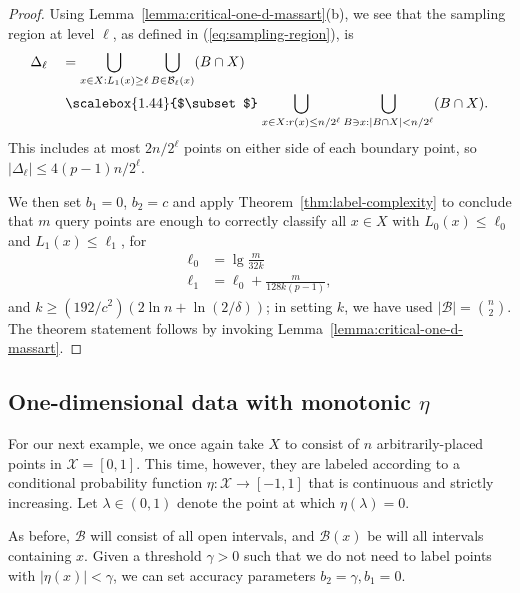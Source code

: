 \documentclass[anon,12pt]{colt2022} %
\def\X{{\mathcal X}}
\def\B{{\mathcal B}}
\newcommand\bigsubset[1][1.19]{%
   \mathrel{\vcenter{\hbox{\scalebox{#1}{$\subset$}}}}}
\begin{document}
\begin{proof}
Using Lemma~\ref{lemma:critical-one-d-massart}(b), we see that the sampling region at level $\ell$, as defined in (\ref{eq:sampling-region}), is
\begin{align*}
\Delta_\ell \ \ \ 
&= \bigcup_{x \in X: L_1(x) \geq \ell} \bigcup_{B \in \B_{\ell}(x)} (B \cap X) \\
&\bigsubset[1.44] \bigcup_{x \in X: r(x) \leq n/2^\ell} \bigcup_{B \ni x: |B \cap X| < n/2^\ell} (B \cap X) 
.
\end{align*}
This includes at most $2n/2^{\ell}$ points on either side of each boundary point, so $|\Delta_\ell| \leq 4(p-1)n/2^{\ell}$.

We then set $b_1 = 0$, $b_2 = c$ and apply Theorem~\ref{thm:label-complexity} to conclude that $m$ query points are enough to correctly classify all $x \in X$ with $L_0(x) \leq \ell_0$ and $L_1(x) \leq \ell_1$, for
\begin{align*}
\ell_0
&= 
\lg \frac{m}{32k} \\
\ell_1
&=
\ell_0 + \frac{m}{128 k(p-1)},
\end{align*}
and $k \geq (192/c^2)(2 \ln n + \ln (2/\delta))$; in setting $k$, we have used $|\B| = {n \choose 2}$. The theorem statement follows by invoking Lemma~\ref{lemma:critical-one-d-massart}.
\end{proof}

\subsection{One-dimensional data with monotonic $\eta$}

For our next example, we once again take $X$ to consist of $n$ arbitrarily-placed points in $\X = [0,1]$. This time, however, they are labeled according to a conditional probability function $\eta: \X \to [-1,1]$ that is continuous and strictly increasing. Let $\lambda \in (0,1)$ denote the point at which $\eta(\lambda) = 0$.

As before, $\B$ will consist of all open intervals, and $\B(x)$ be will all intervals containing $x$. Given a threshold $\gamma > 0$ such that we do not need to label points with $|\eta(x)| < \gamma$, we can set accuracy parameters $b_2 = \gamma, b_1 = 0$.
\end{document}
